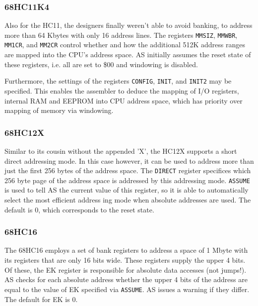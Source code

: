 \documentclass[12pt,twoside]{report}
\newcommand{\tty}[1]{{\tt #1}}
\newcommand{\asname}{{AS}}
\begin{document}

\subsubsection{68HC11K4}

Also for the HC11, the designers finally weren't able to avoid banking, to
address more than 64 Kbytes with only 16
address lines.  The registers {\tt MMSIZ}, {\tt MMWBR}, {\tt MM1CR}, and
{\tt MM2CR} control whether and how the additional 512K address ranges are
mapped into the CPU's address space.  \asname{} initially assumes the reset
state of these registers, i.e. all are set to \$00 and windowing is
disabled.

Furthermore, the settings of the registers {\tt CONFIG}, {\tt INIT}, and
{\tt INIT2} may be specified.  This enables the assembler to deduce the mapping
of I/O registers, internal RAM and EEPROM into CPU address space, which
has priority over mapping of memory via windowing.


\subsubsection{68HC12X}

Similar to its cousin without the appended 'X', the HC12X supports a short
direct addressing mode.  In this case however, it can be used to address
more than just the first 256 bytes of the address space.  The {\tt DIRECT}
register specifices which 256 byte page of the address space is addressed
by this addressing mode.  {\tt ASSUME} is used to tell \asname{} the current
value of this register, so it is able to automatically select the most
efficient address ing mode when absolute addresses are used.  The default
is 0, which corresponds to the reset state.


\subsubsection{68HC16}

The 68HC16 employs a set of bank registers to address a space of 1
Mbyte with its registers that are only 16 bits wide.  These registers
supply the upper 4 bits.  Of these, the EK register is responsible
for absolute data accesses (not jumps!).  \asname{} checks for each absolute
address whether the upper 4 bits of the address are equal to the
value of EK specified via \tty{ASSUME}.  \asname{} issues a warning if they
differ.  The default for EK is 0.
\end{document}
